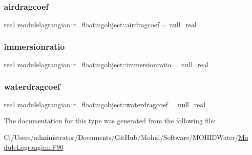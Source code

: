\subsubsection{\texorpdfstring{airdragcoef}{airdragcoef}}
{\footnotesize\ttfamily real modulelagrangian\+::t\+\_\+floatingobject\+::airdragcoef = null\+\_\+real\hspace{0.3cm}{\ttfamily [private]}}

\mbox{\label{structmodulelagrangian_1_1t__floatingobject_a86e74c0d30445ff3128b168e01b967e3}} 
\subsubsection{\texorpdfstring{immersionratio}{immersionratio}}
{\footnotesize\ttfamily real modulelagrangian\+::t\+\_\+floatingobject\+::immersionratio = null\+\_\+real\hspace{0.3cm}{\ttfamily [private]}}

\mbox{\label{structmodulelagrangian_1_1t__floatingobject_aa98f80a916ef1a9169271fa7dc938148}} 
\subsubsection{\texorpdfstring{waterdragcoef}{waterdragcoef}}
{\footnotesize\ttfamily real modulelagrangian\+::t\+\_\+floatingobject\+::waterdragcoef = null\+\_\+real\hspace{0.3cm}{\ttfamily [private]}}



The documentation for this type was generated from the following file\+:\begin{DoxyCompactItemize}
\item 
C\+:/\+Users/administrator/\+Documents/\+Git\+Hub/\+Mohid/\+Software/\+M\+O\+H\+I\+D\+Water/\mbox{\hyperlink{_module_lagrangian_8_f90}{Module\+Lagrangian.\+F90}}\end{DoxyCompactItemize}
